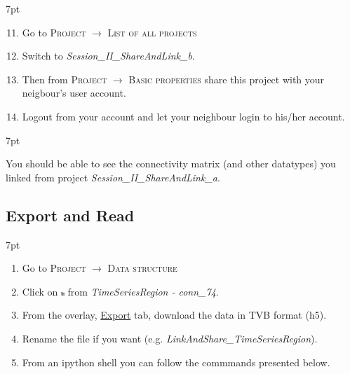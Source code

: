 \documentclass{tufte-handout}
\newenvironment{formal}{%
  \def\FrameCommand{%
    \hspace{1pt}%
    {\color{DarkBlue}\vrule width 2pt}%
    {\color{formalshade}\vrule width 4pt}%
    \colorbox{formalshade}%
  }%
  \MakeFramed{\advance\hsize-\width\FrameRestore}%
  \noindent\hspace{-4.55pt}%
  \begin{adjustwidth}{}{7pt}%
  \vspace{2pt}\vspace{2pt}%
}
{%
  \vspace{2pt}\end{adjustwidth}\endMakeFramed%
}
\newenvironment{blah}{%
  \def\FrameCommand{%
    \hspace{1pt}%
    {\color{DarkOrange}\vrule width 2pt}%
    {\color{PeachPuff}\vrule width 4pt}%
    \colorbox{PeachPuff}%
  }%
  \MakeFramed{\advance\hsize-\width\FrameRestore}%
  \noindent\hspace{-4.55pt}%
  \begin{adjustwidth}{}{7pt}%
  \vspace{2pt}\vspace{2pt}%
}
{%
  \vspace{2pt}\end{adjustwidth}\endMakeFramed%
}
\begin{document}
\begin{formal}
  \begin{enumerate}[resume]
    \setcounter{enumi}{10}
    \item Go to \textsc{Project} $\rightarrow$ \textsc{List of all projects}
    \item Switch to \textit{Session\_II\_ShareAndLink\_b}.
    \item Then from \textsc{Project} $\rightarrow$ \textsc{Basic properties} 
share this project with your neigbour's user account. 
    \item Logout from your account and let your neighbour login to his/her account. 
  \end{enumerate}
\end{formal} 

\begin{blah}
You should be able to see the connectivity matrix (and other datatypes) you linked
from project \textit{Session\_II\_ShareAndLink\_a}.
\end{blah}

\subsection{Export and Read}\label{sec:link_and_share}

\begin{formal}
  \begin{enumerate}
    \item Go to \textsc{Project} $\rightarrow$ \textsc{Data structure}
    \item Click on \includegraphics[width=0.01\textwidth]{nodeTimeSeriesRegion.png} from \textit{TimeSeriesRegion - conn\_74}. 
    \item From the overlay, \underline{Export} tab, download the data in TVB format (h5).
    \item Rename the file if you want (e.g. \textit{LinkAndShare\_TimeSeriesRegion}).
    \item From an ipython shell you can follow the commmands presented below. 
  \end{enumerate}
\end{formal} 
\end{document}

